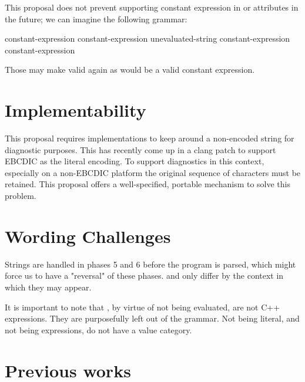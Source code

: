 \documentclass{wg21}
\begin{document}
This proposal does not prevent supporting constant expression in  or attributes in
the future; we can imagine the following grammar:

\begin{bnf}
    \br
     \terminal{(} constant-expression \terminal{)} \terminal{;}\br
     \terminal{(} constant-expression \terminal{,} unevaluated-string \terminal{)} \terminal{;}\br
     \terminal{(} constant-expression \terminal{,} constant-expression \terminal{)} \terminal{;}
\end{bnf}

Those may make  valid again as  would be a valid constant expression.


\section{Implementability}

This proposal requires implementations to keep around a non-encoded string for diagnostic purposes.
This has recently come up in a clang patch to support EBCDIC as the literal encoding.
To support diagnostics in this context, especially on a non-EBCDIC platform the original sequence of characters must be retained.
This proposal offers a well-specified, portable mechanism to solve this problem.

\section{Wording Challenges}

Strings are handled in phases 5 and 6 before the program is parsed,
which might force us to have a "reversal" of these phases.
 and  only differ by the context in which they may appear.

It is important to note that , by virtue of not being evaluated, are not C++ expressions.
They are purposefully left out of the  grammar.
Not being literal, and not being expressions,  do not have a value category.

\section{Previous works}
\end{document}
